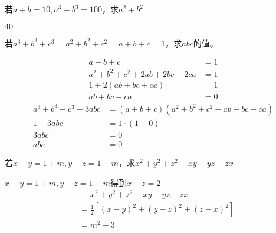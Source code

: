 \documentclass[windows,csize4,answers]{BHCexam}
\begin{document}
\begin{groups}
\begin{questions}[]
        \question[5] 若$a+b=10, a^3+b^3=100$，求$a^2+b^2$
        \begin{solution}{0.5cm}
            \methodonly $40$
        \end{solution}
        \vspace{3.5cm}

        \question[5] 若$a^3+b^3+c^3=a^2+b^2+c^2=a+b+c=1$，求$abc$的值。
        \begin{solution}{0.5cm}
            \methodonly
            \[
                \begin{aligned}
                    a+b+c&=1 \\ 
                    a^2+b^2+c^2+2ab+2bc+2ca&=1 \\ 
                    1+2(ab+bc+ca)&=1 \\ 
                    ab+bc+ca&=0
                \end{aligned}
            \]
            \[
                \begin{aligned}
                    a^3+b^3+c^3-3abc&=(a+b+c)(a^2+b^2+c^2-ab-bc-ca) \\ 
                    1-3abc&=1\cdot(1-0) \\ 
                    3abc&=0 \\
                    abc&=0
                \end{aligned}
            \]
        \end{solution}
        \vspace{3.5cm}

        \question[5] 若$x-y=1+m, y-z=1-m$，求$x^2+y^2+z^2-xy-yz-zx$
        \begin{solution}{0.5cm}
            \methodonly $x-y=1+m, y-z=1-m$得到$x-z=2$
            \[
                \begin{aligned}
                    &\phantom{=}x^2+y^2+z^2-xy-yz-zx \\ 
                    &=\frac{1}{2}[(x-y)^2+(y-z)^2+(z-x)^2] \\ 
                    &=m^2+3
                \end{aligned}
            \]
        \end{solution}
        \vspace{3.5cm}



\end{questions}
\end{groups}
\end{document}
